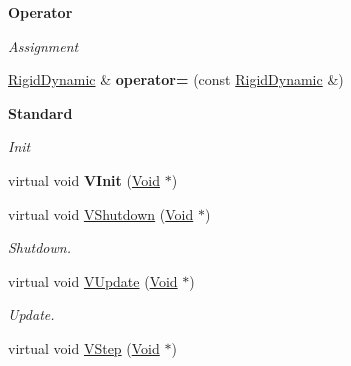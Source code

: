 \begin{Indent}{\bf Operator}\par
{\em \label{_amgrpe1b3ec89ead7f83a9245ed5c9cacfdbf}
 Assignment }\begin{DoxyCompactItemize}
\item 
\hypertarget{classContent_1_1Actor_1_1Admin_1_1RigidDynamic_a45d9456837cbdbed7a11ae3fc4b051d4}{
\hyperlink{classContent_1_1Actor_1_1Admin_1_1RigidDynamic}{RigidDynamic} \& {\bfseries operator=} (const \hyperlink{classContent_1_1Actor_1_1Admin_1_1RigidDynamic}{RigidDynamic} \&)}
\label{classContent_1_1Actor_1_1Admin_1_1RigidDynamic_a45d9456837cbdbed7a11ae3fc4b051d4}

\end{DoxyCompactItemize}
\end{Indent}
\begin{Indent}{\bf Standard}\par
{\em \label{_amgrpeb6d8ae6f20283755b339c0dc273988b}
 Init }\begin{DoxyCompactItemize}
\item 
\hypertarget{classContent_1_1Actor_1_1Admin_1_1RigidDynamic_a6d1902bed1ff97c4069ef404e488dcb1}{
virtual void {\bfseries VInit} (\hyperlink{structVoid}{Void} $\ast$)}
\label{classContent_1_1Actor_1_1Admin_1_1RigidDynamic_a6d1902bed1ff97c4069ef404e488dcb1}

\item 
\hypertarget{classContent_1_1Actor_1_1Admin_1_1RigidDynamic_ab215d05d76f5c8a0824e23f588378b68}{
virtual void \hyperlink{classContent_1_1Actor_1_1Admin_1_1RigidDynamic_ab215d05d76f5c8a0824e23f588378b68}{VShutdown} (\hyperlink{structVoid}{Void} $\ast$)}
\label{classContent_1_1Actor_1_1Admin_1_1RigidDynamic_ab215d05d76f5c8a0824e23f588378b68}

\begin{DoxyCompactList}\small\item\em Shutdown. \item\end{DoxyCompactList}\item 
\hypertarget{classContent_1_1Actor_1_1Admin_1_1RigidDynamic_a8093bd889cfc35730b175c9f87bac2dd}{
virtual void \hyperlink{classContent_1_1Actor_1_1Admin_1_1RigidDynamic_a8093bd889cfc35730b175c9f87bac2dd}{VUpdate} (\hyperlink{structVoid}{Void} $\ast$)}
\label{classContent_1_1Actor_1_1Admin_1_1RigidDynamic_a8093bd889cfc35730b175c9f87bac2dd}

\begin{DoxyCompactList}\small\item\em Update. \item\end{DoxyCompactList}\item 
\hypertarget{classContent_1_1Actor_1_1Admin_1_1RigidDynamic_ae7b5c942c8ed0fa2783a4fdbd485fda9}{
virtual void \hyperlink{classContent_1_1Actor_1_1Admin_1_1RigidDynamic_ae7b5c942c8ed0fa2783a4fdbd485fda9}{VStep} (\hyperlink{structVoid}{Void} $\ast$)}
\label{classContent_1_1Actor_1_1Admin_1_1RigidDynamic_ae7b5c942c8ed0fa2783a4fdbd485fda9}


\end{DoxyCompactItemize}
\end{Indent}
